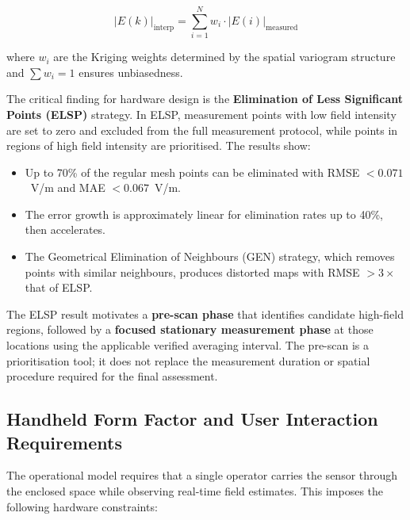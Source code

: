 \documentclass[11pt,a4paper]{article}
\begin{document}
\begin{equation}
    |E(k)|_{\text{interp}} = \sum_{i=1}^{N} w_i \cdot |E(i)|_{\text{measured}}
    \label{eq:kriging}
\end{equation}

\noindent where $w_i$ are the Kriging weights determined by the spatial variogram structure and $\sum w_i = 1$ ensures unbiasedness.

The critical finding for hardware design is the \textbf{Elimination of Less Significant Points (ELSP)} strategy. In ELSP, measurement points with low field intensity are set to zero and excluded from the full measurement protocol, while points in regions of high field intensity are prioritised. The results show:

\begin{itemize}
    \item Up to 70\% of the regular mesh points can be eliminated with RMSE $< 0.071$~V/m and MAE $< 0.067$~V/m.
    \item The error growth is approximately linear for elimination rates up to 40\%, then accelerates.
    \item The Geometrical Elimination of Neighbours (GEN) strategy, which removes points with similar neighbours, produces distorted maps with RMSE $> 3\times$ that of ELSP.
\end{itemize}

\noindent The ELSP result motivates a \textbf{pre-scan phase} that identifies candidate high-field regions, followed by a \textbf{focused stationary measurement phase} at those locations using the applicable verified averaging interval. The pre-scan is a prioritisation tool; it does not replace the measurement duration or spatial procedure required for the final assessment.

\subsection{Handheld Form Factor and User Interaction Requirements}

The operational model requires that a single operator carries the sensor through the enclosed space while observing real-time field estimates. This imposes the following hardware constraints:
\end{document}
